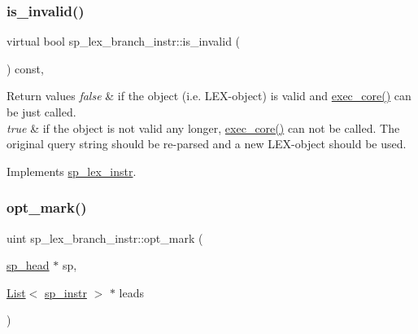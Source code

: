 \subsubsection{\texorpdfstring{is\+\_\+invalid()}{is\_invalid()}}
{\footnotesize\ttfamily virtual bool sp\+\_\+lex\+\_\+branch\+\_\+instr\+::is\+\_\+invalid (\begin{DoxyParamCaption}{ }\end{DoxyParamCaption}) const\hspace{0.3cm}{\ttfamily [inline]}, {\ttfamily [virtual]}}


\begin{DoxyRetVals}{Return values}
{\em false} & if the object (i.\+e. L\+EX-\/object) is valid and \mbox{\hyperlink{classsp__lex__instr_acab4e56f638f43101c11f838e1f9d395}{exec\+\_\+core()}} can be just called.\\
\hline
{\em true} & if the object is not valid any longer, \mbox{\hyperlink{classsp__lex__instr_acab4e56f638f43101c11f838e1f9d395}{exec\+\_\+core()}} can not be called. The original query string should be re-\/parsed and a new L\+EX-\/object should be used. \\
\hline
\end{DoxyRetVals}


Implements \mbox{\hyperlink{classsp__lex__instr_a56788cb475ccf94f224816006d9c90e9}{sp\+\_\+lex\+\_\+instr}}.

\mbox{\label{classsp__lex__branch__instr_a07500581e51283aad3b04602a7b87c74}} 
\subsubsection{\texorpdfstring{opt\+\_\+mark()}{opt\_mark()}}
{\footnotesize\ttfamily uint sp\+\_\+lex\+\_\+branch\+\_\+instr\+::opt\+\_\+mark (\begin{DoxyParamCaption}\item[{\mbox{\hyperlink{classsp__head}{sp\+\_\+head}} $\ast$}]{sp,  }\item[{\mbox{\hyperlink{classList}{List}}$<$ \mbox{\hyperlink{classsp__instr}{sp\+\_\+instr}} $>$ $\ast$}]{leads }\end{DoxyParamCaption})\hspace{0.3cm}{\ttfamily [virtual]}}

